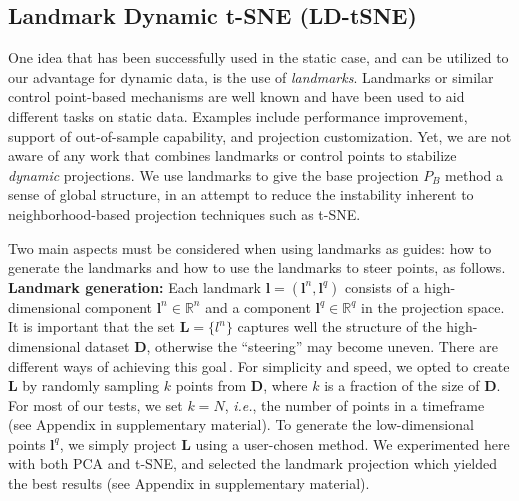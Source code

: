 \subsection{Landmark Dynamic t-SNE (LD-tSNE)}
\label{sec:ld-tsne}
%
One idea that has been successfully used in the static case, and can be utilized to our advantage for dynamic data, is the use of \emph{landmarks}. 
Landmarks or similar control point-based mechanisms are well known and have been used to aid different tasks on static data. Examples include performance improvement\cite{Pekalska1999,DeSilva2003,DeSilva2004,Vladymyrov2013,Paulovich2008,Kruiger2017a}, support of out-of-sample capability\cite{Boytsov2017,Policar2019}, and projection customization\cite{Joia2011,updis}.
Yet, we are not aware of any work that combines landmarks or control points to stabilize \emph{dynamic} projections. We use landmarks to give the base projection $P_B$ method a sense of global structure, in an attempt to reduce the instability inherent to neighborhood-based projection techniques such as t-SNE.

Two main aspects must be considered when using landmarks as guides: how to generate the landmarks and how to use the landmarks to steer points, as follows.\\

\vspace{-0.15cm}
\noindent\textbf{Landmark generation:} Each landmark $\mathbf{l}=\left(\mathbf{l}^n, \mathbf{l}^q\right)$ consists of a high-dimensional component $\mathbf{l}^n \in \mathbb{R}^n$ and a component $\mathbf{l}^q \in \mathbb{R}^q$ in the projection space.
It is important that the set $\mathbf{L} = \{ l^n \}$ captures well the structure of the high-dimensional dataset $\mathbf{D}$, otherwise the ``steering'' may become uneven. There are different ways of achieving this goal\,\cite{DeSilva2005}. For simplicity and speed, we opted to create $\mathbf{L}$ by randomly sampling $k$ points from $\mathbf{D}$, where $k$ is a fraction of the size of $\mathbf{D}$. For most of our tests, we set $k=N$, \emph{i.e.}, the number of points in a timeframe (see Appendix in supplementary material). To generate the low-dimensional points $\mathbf{l}^q$, we simply project $\mathbf{L}$ using a user-chosen method. We experimented here with both PCA and t-SNE, and selected the landmark projection which yielded the best results (see Appendix in supplementary material).\\

